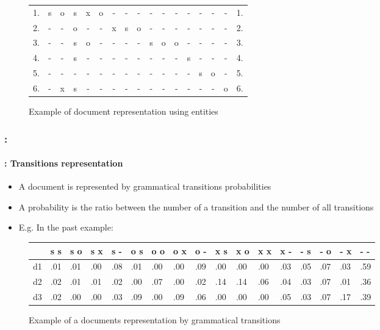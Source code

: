 \documentclass[xcolor=table]{beamer}
\begin{document}
\begin{frame}
\begin{figure}
{\begin{tabular}{ccccccccccccccccc}
			1. & s & o & s & x & o & - & - & - & - & - & - & - & - & - & - & 1. \\
			2. & - & - & o & - & - & x & s & o & - & - & - & - & - & - & - & 2. \\
			3. & - & - & s & o & - & - & - & - & s & o & o & - & - & - & - & 3. \\
			4. & - & - & s & - & - & - & - & - & - & - & - & s & - & - & - & 4. \\
			5. & - & - & - & - & - & - & - & - & - & - & - & - & s & o & - & 5. \\
			6. & - & x & s & - & - & - & - & - & - & - & - & - & - & - & o & 6. \\
			
		\end{tabular}}
		\caption{Example of document representation using entities \cite{2008-barzilay-lapata}}
	\end{figure}
	
\end{frame}

\begin{frame}
	\frametitle{\insertshortsubtitle: \insertsection}
	\framesubtitle{\insertsubsection: Transitions representation}
	
	\begin{itemize}
		\item A document is represented by grammatical transitions probabilities
		\item A probability is the ratio between the number of a transition and the number of all transitions
		\item E.g. In the past example: 
	\end{itemize}
	\begin{figure}
		{\tiny\bfseries
		\begin{tabular}{lllllllllllllllll}
			\hline
			& s s & s o & s x & s - & o s & o o & o x & o - & x s & x o & x x & x - & - s & - o & - x & - - \\
			\hline
			d1 & .01 & .01 & .00 & .08 & .01 & .00 & .00 & .09 & .00 & .00 & .00 & .03 & .05 & .07 & .03 & .59 \\
			d2 & .02 & .01 & .01 & .02 & .00 & .07 & .00 & .02 & .14 & .14 & .06 & .04 & .03 & .07 & .01 & .36 \\
			d3 & .02 & .00 & .00 & .03 & .09 & .00 & .09 & .06 & .00 & .00 & .00 & .05 & .03 & .07 & .17 & .39 \\
			\hline
		\end{tabular}}
		\caption{Example of a documents representation by grammatical transitions \cite{2008-barzilay-lapata}}
	\end{figure}
	
\end{frame}
\end{document}
